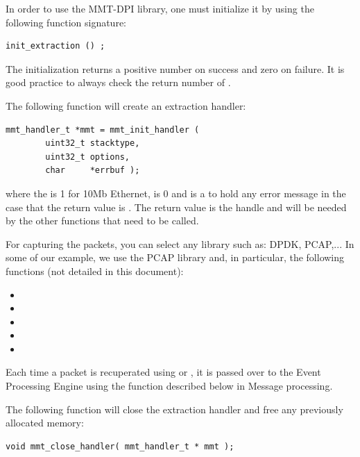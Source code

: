 In order to use the MMT-DPI library, one must initialize it by using the following function signature:

\begin{lstlisting}[style=Cpp]
init_extraction () ;
\end{lstlisting}

The initialization returns a positive number on success and zero on failure. It is good practice to always check the return number of .

The following function will create an extraction handler:

\begin{lstlisting}[style=Cpp]
mmt_handler_t *mmt = mmt_init_handler (
        uint32_t stacktype,
        uint32_t options,
        char     *errbuf );
\end{lstlisting}

where the  is 1 for 10Mb Ethernet,  is 0 and  is a  to hold any error message in the case that the return value is . The return value is the handle and will be needed by the other functions that need to be called.

For capturing the packets, you can select any library such as: DPDK, PCAP,... In some of our example, we use the PCAP library and, in particular, the following functions (not detailed in this document):
\begin{itemize}
\item    {}
\item    {}
\item    {}
\item    {}
\item    {}
\end{itemize}    
    
Each time a packet is recuperated using  or , it is passed over to the Event Processing Engine using the  function described below in Message processing.

The following function will close the extraction handler and free any previously allocated memory:

\begin{lstlisting}[style=Cpp]
void mmt_close_handler( mmt_handler_t * mmt );
\end{lstlisting}

